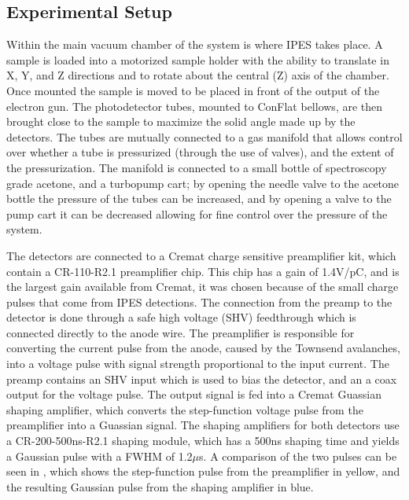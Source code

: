 \subsection{Experimental Setup}

Within the main vacuum chamber of the system is where IPES takes place. A sample is loaded into a motorized sample holder with the ability to translate in X, Y, and Z directions 
and to rotate about the central (Z) axis of the chamber. Once mounted the sample is moved to be placed in front of the output of the electron gun. The photodetector tubes, mounted to 
ConFlat bellows, are then brought close to the sample to maximize the solid angle made up by the detectors. The tubes are mutually connected to a gas manifold that allows control 
over whether a tube is pressurized (through the use of valves), and the extent of the pressurization. The manifold is connected to a small bottle of spectroscopy grade acetone, and
a turbopump cart; by opening the needle valve to the acetone bottle the pressure of the tubes can be increased, and by opening a valve to the pump cart it can be decreased allowing 
for fine control over the pressure of the system.

The detectors are connected to a Cremat charge sensitive preamplifier kit\cite{CR-150-R5}, which contain a CR-110-R2.1 preamplifier chip\cite{CR-11X}. This chip has a gain of 1.4V/pC, and is the 
largest gain available from Cremat, it was chosen because of the small charge pulses that come from IPES detections. The connection from the preamp to the detector is done through a 
safe high voltage (SHV) feedthrough which is connected directly to the anode wire. The preamplifier is responsible for converting the current pulse from the anode, caused by the 
Townsend avalanches, into a voltage pulse with signal strength proportional to the input current. The preamp contains an SHV input which is used to bias the detector, and 
an a coax output for the voltage pulse. The output signal is fed into a Cremat Guassian shaping amplifier\cite{CR-160-BOX-R4}, which converts the step-function voltage pulse from 
the preamplifier into a Guassian signal. The shaping amplifiers for both detectors use a CR-200-500ns-R2.1 shaping module, which has a 500ns shaping time and yields a Gaussian pulse
with a FWHM of 1.2$\mu$s\cite{CR-200-X}. A comparison of the two pulses can be seen in , which shows the step-function pulse from the preamplifier in yellow, and the 
resulting Gaussian pulse from the shaping amplifier in blue. 

